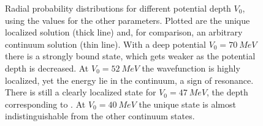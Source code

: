\documentclass[../main/report.tex]{subfiles}
\begin{document}


\begin{figure}
  \caption{
    Radial probability distributions for different potential depth $V_0$, using the  values for the other parameters. 
    Plotted are the unique localized solution (thick line) and, for comparison, an arbitrary continuum solution (thin line).
    With a deep potential $V_0 = \SI{70}{MeV}$ there is a strongly bound state, which gets weaker as the potential depth is decreased.
    At $V_0 = \SI{52}{MeV}$ the wavefunction is highly localized, yet the energy lie in the continuum, a sign of resonance.
    There is still a clearly localized state for $V_0 = \SI{47}{MeV}$, the depth corresponding to . At $V_0 = \SI{40}{MeV}$ the unique state is almost indistinguishable from the other continuum states.
  } 
  \label{fig:wavefunctions}
  \end{figure}

\end{document}
